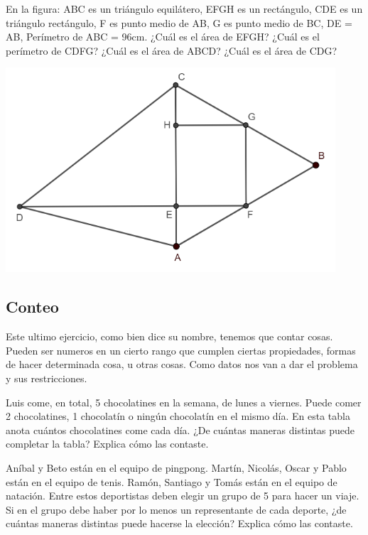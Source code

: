\documentclass{article}
\begin{document}
\begin{ejemplo}
En la figura:
ABC es un triángulo equilátero,
EFGH es un rectángulo,
CDE es un triángulo rectángulo,
F es punto medio de AB,
G es punto medio de BC,
DE = AB,
Perímetro de ABC = 96cm.
¿Cuál es el área de EFGH?
¿Cuál es el perímetro de CDFG?
¿Cuál es el área de ABCD?
¿Cuál es el área de CDG?

\includegraphics[scale=0.6]{geometry-example-2}
\end{ejemplo}

\subsection{Conteo}
\begin{small}
Este ultimo ejercicio, como bien dice su nombre, tenemos que contar cosas. Pueden ser numeros en un cierto rango que cumplen ciertas propiedades, formas de hacer determinada cosa, u otras cosas. Como datos nos van a dar el problema y sus restricciones.
\\
\end{small}

\begin{ejemplo}
Luis come, en total, 5 chocolatines en la semana, de lunes a viernes.
Puede comer 2 chocolatines, 1 chocolatín o ningún chocolatín en el mismo día.
En esta tabla anota cuántos chocolatines come cada día.
¿De cuántas maneras distintas puede completar la tabla?
Explica cómo las contaste.
\end{ejemplo}

\begin{ejemplo}
Aníbal y Beto están en el equipo de pingpong.
Martín, Nicolás, Oscar y Pablo están en el equipo de tenis.
Ramón, Santiago y Tomás están en el equipo de natación.
Entre estos deportistas deben elegir un grupo de 5 para hacer un viaje.
Si en el grupo debe haber por lo menos un representante de cada deporte,
¿de cuántas maneras distintas puede hacerse la elección?
Explica cómo las contaste.
\end{ejemplo}
\end{document}
